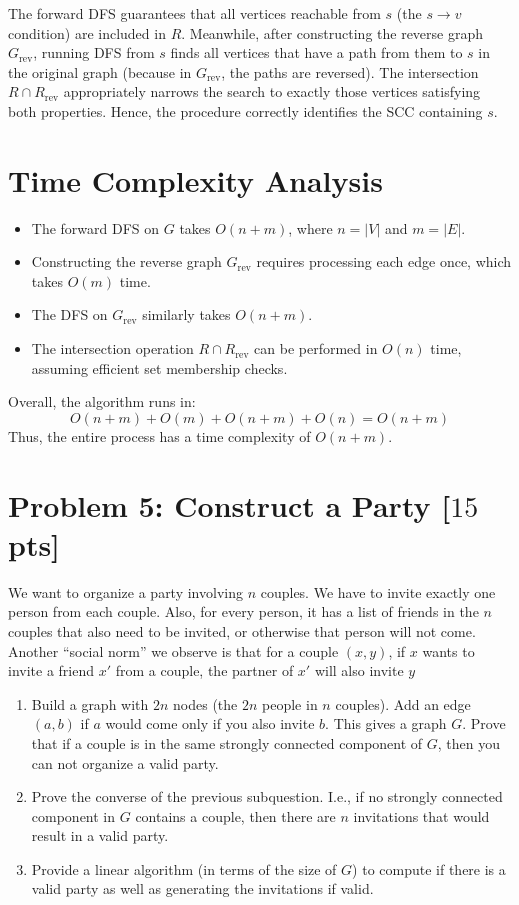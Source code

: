\documentclass[letterpaper, 11pt]{article}
\newcommand{\1}{\mathds{1}}	%
\theoremstyle{definition}
\newcommand{\problem}[1]{\section*{Problem #1}}
\newenvironment{solution}{{\par\noindent\it Solution.}}{}
\begin{document}
\begin{solution}
The forward DFS guarantees that all vertices reachable from \(s\) (the \(s \rightarrow v\) condition) are included in \(R\). Meanwhile, after constructing the reverse graph \(G_{\text{rev}}\), running DFS from \(s\) finds all vertices that have a path from them to \(s\) in the original graph (because in \(G_{\text{rev}}\), the paths are reversed). The intersection \(R \cap R_{\text{rev}}\) appropriately narrows the search to exactly those vertices satisfying both properties. Hence, the procedure correctly identifies the SCC containing \(s\).

\section*{Time Complexity Analysis}

\begin{itemize}
    \item The forward DFS on \(G\) takes \(O(n+m)\), where \(n=|V|\) and \(m=|E|\).
    \item Constructing the reverse graph \(G_{\text{rev}}\) requires processing each edge once, which takes \(O(m)\) time.
    \item The DFS on \(G_{\text{rev}}\) similarly takes \(O(n+m)\).
    \item The intersection operation \(R \cap R_{\text{rev}}\) can be performed in \(O(n)\) time, assuming efficient set membership checks.
\end{itemize}

Overall, the algorithm runs in:
\[
O(n+m) + O(m) + O(n+m) + O(n) = O(n+m)
\]
Thus, the entire process has a time complexity of \(O(n+m)\).

\end{solution}
\clearpage



\problem{5: Construct a Party [$15$ pts]}
We want to organize a party involving $n$ couples. We have to invite exactly one person from each couple. Also, for every person, it has a list of friends in the $n$ couples that also need to be invited, or otherwise that person will not come. Another ``social norm'' we observe is that for a couple $(x, y)$,  if $x$ wants to invite a friend $x'$ from a couple, the partner of $x'$ will also invite $y$

\begin{enumerate}
    \item Build a graph with $2n$ nodes (the $2n$ people in $n$ couples). Add an edge $(a,b)$ if $a$ would come only if you also invite $b$. This gives a graph $G$. Prove that if a couple is in the same strongly connected component of $G$, then you can not organize a valid party.

    \item Prove the converse of the previous subquestion. I.e., if no strongly connected component in $G$ contains a couple, then there are $n$ invitations that would result in a valid party.

    \item Provide a linear algorithm (in terms of the size of $G$) to compute if there is a valid party as well as generating the invitations if valid.
\end{enumerate}
\end{document}

